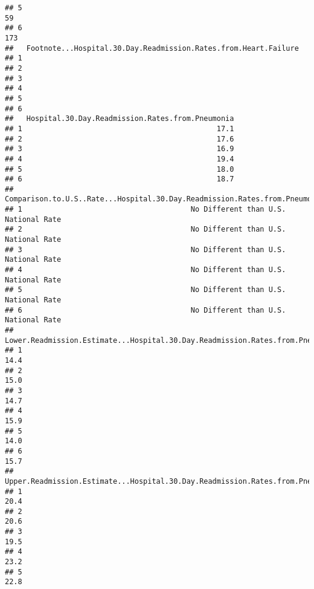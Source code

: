 \documentclass[]{article}
\begin{document}
\begin{verbatim}
## 5                                                                        59
## 6                                                                       173
##   Footnote...Hospital.30.Day.Readmission.Rates.from.Heart.Failure
## 1                                                                
## 2                                                                
## 3                                                                
## 4                                                                
## 5                                                                
## 6                                                                
##   Hospital.30.Day.Readmission.Rates.from.Pneumonia
## 1                                             17.1
## 2                                             17.6
## 3                                             16.9
## 4                                             19.4
## 5                                             18.0
## 6                                             18.7
##   Comparison.to.U.S..Rate...Hospital.30.Day.Readmission.Rates.from.Pneumonia
## 1                                       No Different than U.S. National Rate
## 2                                       No Different than U.S. National Rate
## 3                                       No Different than U.S. National Rate
## 4                                       No Different than U.S. National Rate
## 5                                       No Different than U.S. National Rate
## 6                                       No Different than U.S. National Rate
##   Lower.Readmission.Estimate...Hospital.30.Day.Readmission.Rates.from.Pneumonia
## 1                                                                          14.4
## 2                                                                          15.0
## 3                                                                          14.7
## 4                                                                          15.9
## 5                                                                          14.0
## 6                                                                          15.7
##   Upper.Readmission.Estimate...Hospital.30.Day.Readmission.Rates.from.Pneumonia
## 1                                                                          20.4
## 2                                                                          20.6
## 3                                                                          19.5
## 4                                                                          23.2
## 5                                                                          22.8

\end{verbatim}
\end{document}
